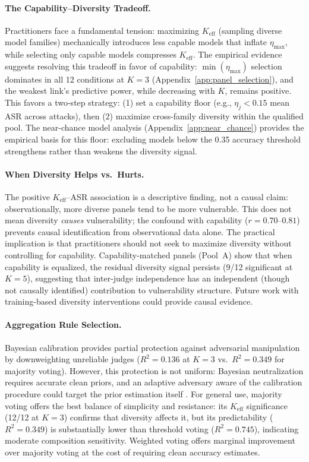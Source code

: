 \paragraph{The Capability--Diversity Tradeoff.} Practitioners face a fundamental tension: maximizing $K_{\mathrm{eff}}$ (sampling diverse model families) mechanically introduces less capable models that inflate $\eta_{\max}$, while selecting only capable models compresses $K_{\mathrm{eff}}$. The empirical evidence suggests resolving this tradeoff in favor of capability: $\min(\eta_{\max})$ selection dominates in all 12 conditions at $K{=}3$ (Appendix~\ref{app:panel_selection}), and the weakest link's predictive power, while decreasing with $K$, remains positive. This favors a two-step strategy: (1) set a capability floor (e.g., $\eta_j{<}0.15$ mean ASR across attacks), then (2) maximize cross-family diversity within the qualified pool. The near-chance model analysis (Appendix~\ref{app:near_chance}) provides the empirical basis for this floor: excluding models below the 0.35 accuracy threshold strengthens rather than weakens the diversity signal.

\paragraph{When Diversity Helps vs.\ Hurts.} The positive $K_{\mathrm{eff}}$--ASR association is a descriptive finding, not a causal claim: observationally, more diverse panels tend to be more vulnerable. This does not mean diversity \emph{causes} vulnerability; the confound with capability ($r{=}0.70$--$0.81$) prevents causal identification from observational data alone. The practical implication is that practitioners should not seek to maximize diversity without controlling for capability. Capability-matched panels (Pool~A) show that when capability is equalized, the residual diversity signal persists (9/12 significant at $K{=}5$), suggesting that inter-judge independence has an independent (though not causally identified) contribution to vulnerability structure. Future work with training-based diversity interventions \citep{kariyappa2019improving,pang2019improving} could provide causal evidence.

\paragraph{Aggregation Rule Selection.} Bayesian calibration provides partial protection against adversarial manipulation by downweighting unreliable judges ($R^2{=}0.136$ at $K{=}3$ vs.\ $R^2{=}0.349$ for majority voting). However, this protection is not uniform: Bayesian neutralization requires accurate clean priors, and an adaptive adversary aware of the calibration procedure could target the prior estimation itself \citep{tambe2011security}. For general use, majority voting offers the best balance of simplicity and resistance: its $K_{\mathrm{eff}}$ significance (12/12 at $K{=}3$) confirms that diversity affects it, but its predictability ($R^2{=}0.349$) is substantially lower than threshold voting ($R^2{=}0.745$), indicating moderate composition sensitivity. Weighted voting offers marginal improvement over majority voting at the cost of requiring clean accuracy estimates.

